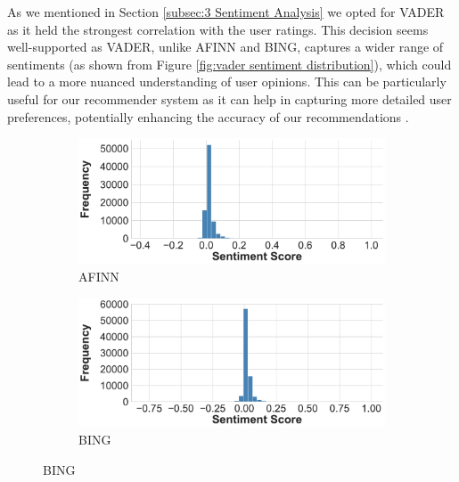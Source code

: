 As we mentioned in Section \ref{subsec:3 Sentiment Analysis} we opted for VADER as it held the strongest correlation with the user ratings. This decision seems well-supported as VADER, unlike AFINN and BING, captures a wider range of sentiments (as shown from Figure \ref{fig:vader sentiment distribution}), which could lead to a more nuanced understanding of user opinions. This can be particularly useful for our recommender system as it can help in capturing more detailed user preferences, potentially enhancing the accuracy of our recommendations \cite{dang2021approach}. 


\begin{figure}[h]
  \centering
  \begin{subfigure}{0.32\textwidth} %
      \includegraphics[width=\textwidth]{Figures/distribution_afinn.pdf} %
      \caption{AFINN}
      \label{fig:afinn sentiment distribution}
  \end{subfigure}
  \hfill
  \begin{subfigure}{0.32\textwidth} %
      \includegraphics[width=\textwidth]{Figures/distribution_bing.pdf} %
      \caption{BING} %
      \label{fig:bing sentiment distribution} %
  \end{subfigure}

\end{figure}
